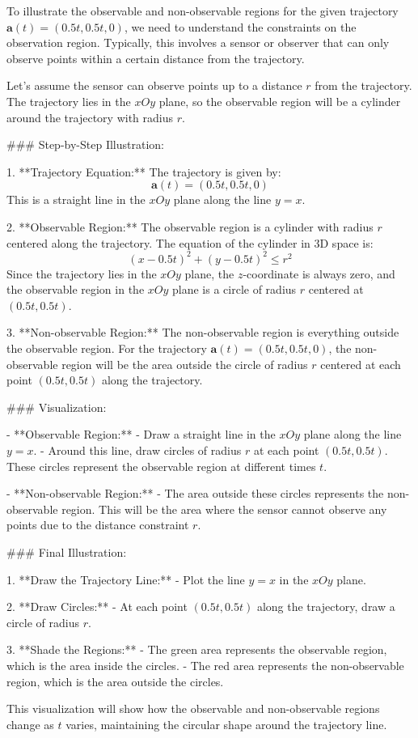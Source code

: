 To illustrate the observable and non-observable regions for the given trajectory \( \mathbf{a}(t) = (0.5t, 0.5t, 0) \), we need to understand the constraints on the observation region. Typically, this involves a sensor or observer that can only observe points within a certain distance from the trajectory.

Let's assume the sensor can observe points up to a distance \( r \) from the trajectory. The trajectory lies in the \( xOy \) plane, so the observable region will be a cylinder around the trajectory with radius \( r \).

### Step-by-Step Illustration:

1. **Trajectory Equation:**
   The trajectory is given by:
   \[
   \mathbf{a}(t) = (0.5t, 0.5t, 0)
   \]
   This is a straight line in the \( xOy \) plane along the line \( y = x \).

2. **Observable Region:**
   The observable region is a cylinder with radius \( r \) centered along the trajectory. The equation of the cylinder in 3D space is:
   \[
   (x - 0.5t)^2 + (y - 0.5t)^2 \leq r^2
   \]
   Since the trajectory lies in the \( xOy \) plane, the \( z \)-coordinate is always zero, and the observable region in the \( xOy \) plane is a circle of radius \( r \) centered at \( (0.5t, 0.5t) \).

3. **Non-observable Region:**
   The non-observable region is everything outside the observable region. For the trajectory \( \mathbf{a}(t) = (0.5t, 0.5t, 0) \), the non-observable region will be the area outside the circle of radius \( r \) centered at each point \( (0.5t, 0.5t) \) along the trajectory.

### Visualization:

- **Observable Region:** 
  - Draw a straight line in the \( xOy \) plane along the line \( y = x \).
  - Around this line, draw circles of radius \( r \) at each point \( (0.5t, 0.5t) \). These circles represent the observable region at different times \( t \).

- **Non-observable Region:**
  - The area outside these circles represents the non-observable region. This will be the area where the sensor cannot observe any points due to the distance constraint \( r \).

### Final Illustration:

1. **Draw the Trajectory Line:**
   - Plot the line \( y = x \) in the \( xOy \) plane.

2. **Draw Circles:**
   - At each point \( (0.5t, 0.5t) \) along the trajectory, draw a circle of radius \( r \).

3. **Shade the Regions:**
   - The green area represents the observable region, which is the area inside the circles.
   - The red area represents the non-observable region, which is the area outside the circles.

This visualization will show how the observable and non-observable regions change as \( t \) varies, maintaining the circular shape around the trajectory line.